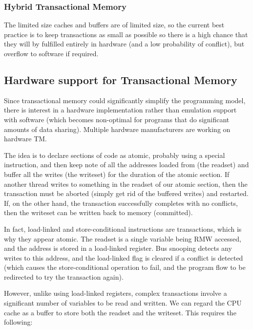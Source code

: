 \subsubsection{Hybrid Transactional Memory}

The limited size caches and buffers are of limited size, so the
current best practice is to keep transactions as small as possible so
there is a high chance that they will by fulfilled entirely in
hardware (and a low probability of conflict), but overflow to software
if required.


\subsection{Hardware support for Transactional Memory}

Since transactional memory could significantly simplify the
programming model, there is interest in a hardware implementation
rather than emulation support with software (which becomes non-optimal
for programs that do significant amounts of data sharing). Multiple
hardware manufacturers are working on hardware TM.

The idea is to declare sections of code as atomic, probably using a
special instruction, and then keep note of all the addresses loaded
from (the readset) and buffer all the writes (the writeset) for the
duration of the atomic section. If another thread writes to something
in the readset of our atomic section, then the transaction must be
aborted (simply get rid of the buffered writes) and restarted. If, on
the other hand, the transaction successfully completes with no
conflicts, then the writeset can be written back to memory
(committed).

In fact, load-linked and store-conditional instructions are
transactions, which is why they appear atomic. The readset is a single
variable being RMW accessed, and the address is stored in a
load-linked register. Bus snooping detects any writes to this address,
and the load-linked flag is cleared if a conflict is detected (which
causes the store-conditional operation to fail, and the program flow
to be redirected to try the transaction again).

However, unlike using load-linked registers, complex transactions
involve a significant number of variables to be read and written. We
can regard the CPU cache as a buffer to store both the readset and the
writeset. This requires the following:

